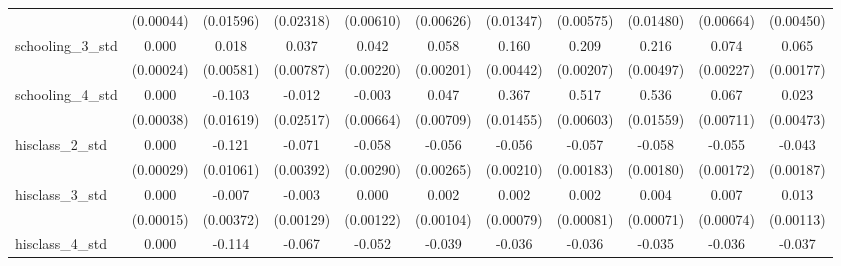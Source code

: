 {\begin{tabular}{l*{10}{c}}
                    &   (0.00044)         &   (0.01596)         &   (0.02318)         &   (0.00610)         &   (0.00626)         &   (0.01347)         &   (0.00575)         &   (0.01480)         &   (0.00664)         &   (0.00450)         \\
schooling\_3\_std     &       0.000         &       0.018\sym{**} &       0.037\sym{***}&       0.042\sym{***}&       0.058\sym{***}&       0.160\sym{***}&       0.209\sym{***}&       0.216\sym{***}&       0.074\sym{***}&       0.065\sym{***}\\
                    &   (0.00024)         &   (0.00581)         &   (0.00787)         &   (0.00220)         &   (0.00201)         &   (0.00442)         &   (0.00207)         &   (0.00497)         &   (0.00227)         &   (0.00177)         \\
schooling\_4\_std     &       0.000         &      -0.103\sym{***}&      -0.012         &      -0.003         &       0.047\sym{***}&       0.367\sym{***}&       0.517\sym{***}&       0.536\sym{***}&       0.067\sym{***}&       0.023\sym{***}\\
                    &   (0.00038)         &   (0.01619)         &   (0.02517)         &   (0.00664)         &   (0.00709)         &   (0.01455)         &   (0.00603)         &   (0.01559)         &   (0.00711)         &   (0.00473)         \\
hisclass\_2\_std      &       0.000         &      -0.121\sym{***}&      -0.071\sym{***}&      -0.058\sym{***}&      -0.056\sym{***}&      -0.056\sym{***}&      -0.057\sym{***}&      -0.058\sym{***}&      -0.055\sym{***}&      -0.043\sym{***}\\
                    &   (0.00029)         &   (0.01061)         &   (0.00392)         &   (0.00290)         &   (0.00265)         &   (0.00210)         &   (0.00183)         &   (0.00180)         &   (0.00172)         &   (0.00187)         \\
hisclass\_3\_std      &       0.000         &      -0.007\sym{*}  &      -0.003\sym{*}  &       0.000         &       0.002         &       0.002\sym{**} &       0.002\sym{**} &       0.004\sym{***}&       0.007\sym{***}&       0.013\sym{***}\\
                    &   (0.00015)         &   (0.00372)         &   (0.00129)         &   (0.00122)         &   (0.00104)         &   (0.00079)         &   (0.00081)         &   (0.00071)         &   (0.00074)         &   (0.00113)         \\
hisclass\_4\_std      &       0.000         &      -0.114\sym{***}&      -0.067\sym{***}&      -0.052\sym{***}&      -0.039\sym{***}&      -0.036\sym{***}&      -0.036\sym{***}&      -0.035\sym{***}&      -0.036\sym{***}&      -0.037\sym{***}\\

\end{tabular}}
